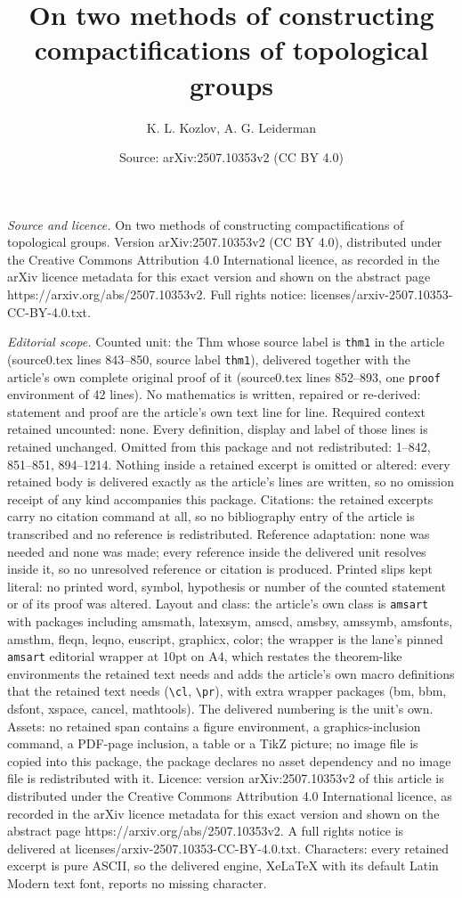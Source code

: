 \documentclass[10pt,a4paper]{amsart}
\title[On two methods of constructing compactifications of topologi]{On two methods of constructing compactifications of topological groups}
\author{K. L. Kozlov, A. G. Leiderman}
\date{Source: arXiv:2507.10353v2 (CC BY 4.0)}
\begin{document}
\maketitle

\noindent\emph{Source and licence.} On two methods of constructing compactifications of topological groups. Version arXiv:2507.10353v2 (CC BY 4.0), distributed under the Creative Commons Attribution 4.0 International licence, as recorded in the arXiv licence metadata for this exact version and shown on the abstract page https://arxiv.org/abs/2507.10353v2. Full rights notice: licenses/arxiv-2507.10353-CC-BY-4.0.txt.\par\smallskip

\noindent\textit{Editorial scope.} Counted unit: the Thm whose source label is \texttt{thm1} in the article (source0.tex lines 843--850, source label \texttt{thm1}), delivered together with the article's own complete original proof of it (source0.tex lines 852--893, one \texttt{proof} environment of 42 lines). No mathematics is written, repaired or re-derived: statement and proof are the article's own text line for line. Required context retained uncounted: none. Every definition, display and label of those lines is retained unchanged. Omitted from this package and not redistributed: 1--842, 851--851, 894--1214. Nothing inside a retained excerpt is omitted or altered: every retained body is delivered exactly as the article's lines are written, so no omission receipt of any kind accompanies this package. Citations: the retained excerpts carry no citation command at all, so no bibliography entry of the article is transcribed and no reference is redistributed. Reference adaptation: none was needed and none was made; every reference inside the delivered unit resolves inside it, so no unresolved reference or citation is produced. Printed slips kept literal: no printed word, symbol, hypothesis or number of the counted statement or of its proof was altered. Layout and class: the article's own class is \texttt{amsart} with packages including amsmath, latexsym, amscd, amsbsy, amssymb, amsfonts, amsthm, fleqn, leqno, euscript, graphicx, color; the wrapper is the lane's pinned \texttt{amsart} editorial wrapper at 10pt on A4, which restates the theorem-like environments the retained text needs and adds the article's own macro definitions that the retained text needs (\texttt{\textbackslash cl}, \texttt{\textbackslash pr}), with extra wrapper packages (bm, bbm, dsfont, xspace, cancel, mathtools). The delivered numbering is the unit's own. Assets: no retained span contains a figure environment, a graphics-inclusion command, a PDF-page inclusion, a table or a TikZ picture; no image file is copied into this package, the package declares no asset dependency and no image file is redistributed with it. Licence: version arXiv:2507.10353v2 of this article is distributed under the Creative Commons Attribution 4.0 International licence, as recorded in the arXiv licence metadata for this exact version and shown on the abstract page https://arxiv.org/abs/2507.10353v2. A full rights notice is delivered at licenses/arxiv-2507.10353-CC-BY-4.0.txt. Characters: every retained excerpt is pure ASCII, so the delivered engine, XeLaTeX with its default Latin Modern text font, reports no missing character.
\end{document}
